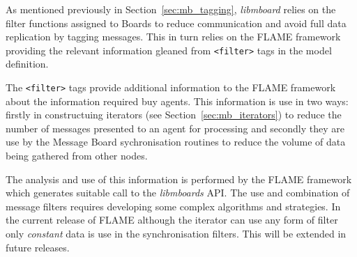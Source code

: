 As mentioned previously in Section~\ref{sec:mb_tagging}, \textit{libmboard} relies on the filter functions assigned to Boards to reduce communication and avoid full data replication by tagging messages. This in turn relies on the FLAME framework providing the relevant information gleaned from \texttt{<filter>} tags in the model definition.

The \texttt{<filter>} tags provide additional information to the FLAME framework about the information required buy agents. This information is use in two ways: firstly in constructuing iterators (see Section~\ref{sec:mb_iterators}) to reduce the number of messages presented to an agent for processing and secondly they are use by the Message Board sychronisation routines to reduce the volume of data being gathered from other nodes.

The analysis and use of this information is performed by the FLAME framework which generates suitable call to the \textit{libmboards} API. The use and combination of message filters  requires developing some complex algorithms and strategies. In the current release of FLAME although the iterator can use any form of filter only \textit{constant} data is use in the synchronisation filters. This will be extended in future releases.


